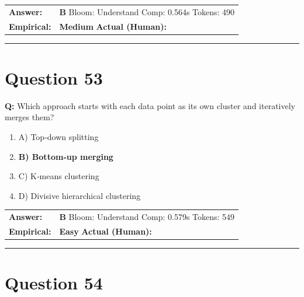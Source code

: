\documentclass[9pt]{article}
\begin{document}
\begin{tabular}{@{}l p{10.5cm}@{}}
\textbf{Answer:} & \textbf{B} \hspace{1em} Bloom: Understand \hspace{1em} Comp: 0.564s \hspace{1em} Tokens: 490 \\
\textbf{Empirical:} & \textbf{Medium} \hspace{1em} \textbf{Actual (Human):} \underline{\hspace{5cm}}
\end{tabular}

\vspace{0.2cm}
\rule{\textwidth}{0.4pt}
\vspace{0.2cm}


\section*{Question 53}

\textbf{Q:} Which approach starts with each data point as its own cluster and iteratively merges them?

\begin{enumerate}[label=\textbf{\alph{*})}, nosep]
    \item A) Top‑down splitting
    \item \textbf{B) Bottom‑up merging} %
    \item C) K‑means clustering
    \item D) Divisive hierarchical clustering

\end{enumerate}

\begin{tabular}{@{}l p{10.5cm}@{}}
\textbf{Answer:} & \textbf{B} \hspace{1em} Bloom: Understand \hspace{1em} Comp: 0.579s \hspace{1em} Tokens: 549 \\
\textbf{Empirical:} & \textbf{Easy} \hspace{1em} \textbf{Actual (Human):} \underline{\hspace{5cm}}
\end{tabular}

\vspace{0.2cm}
\rule{\textwidth}{0.4pt}
\vspace{0.2cm}


\section*{Question 54}
\end{document}
